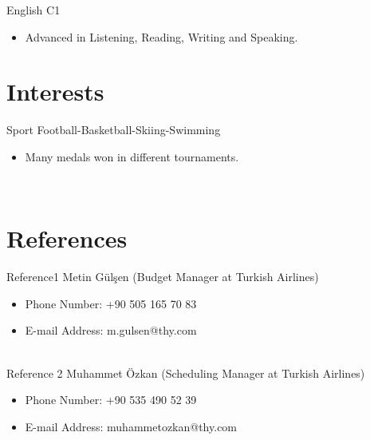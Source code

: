 \documentclass[letterpaper]{ramco_class} %
\begin{document}
\begin{twenty} %
	\twentyitem
	{English}
	{}
	{\hspace{0.3cm}C1}
	{}
	{}
	{\begin{itemize}
			\item Advanced in Listening, Reading, Writing and Speaking.
	\end{itemize}}

\end{twenty}

\section{Interests}

\begin{twenty} %
	\twentyitem
	{Sport}
	{}
	{\hspace{0.3cm}Football-Basketball-Skiing-Swimming}
	{}
	{}
	{\begin{itemize}
			\item Many medals won in different tournaments.
	\end{itemize}}
	\\

\end{twenty}

\section{References}

\begin{twenty} %
	\twentyitem
	{Reference1 }
	{}
	{\hspace{0.3cm}Metin Gülşen (Budget Manager at Turkish Airlines)}
	{}
	{}
	{\begin{itemize}
			\item Phone Number: +90 505 165 70 83
			\item E-mail Address: m.gulsen@thy.com
	\end{itemize}}
	\\
	\twentyitem
	{Reference 2}
	{}
	{\hspace{0.3cm}Muhammet Özkan (Scheduling Manager at Turkish Airlines)}
	{}
	{}
	{\begin{itemize}
			\item Phone Number: +90 535 490 52 39
			\item E-mail Address: muhammetozkan@thy.com
	\end{itemize}}

\end{twenty}
\end{document}
